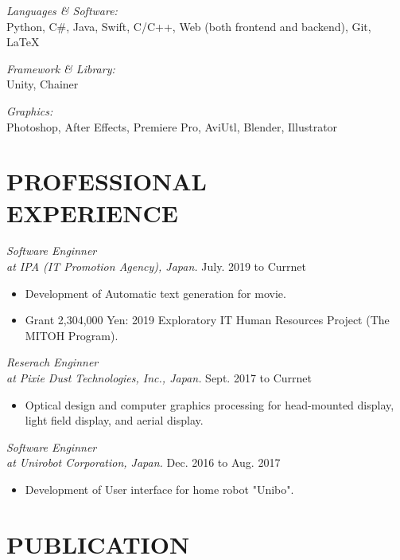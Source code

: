 \documentclass[margin]{res}
\begin{document}
\begin{resume}
{\sl Languages \& Software:}\\
Python,
C\#,
Java,
Swift,
C/C++,
Web (both frontend and backend),
Git, LaTeX

{\sl Framework \& Library:}\\
Unity, Chainer

{\sl Graphics:}\\
Photoshop, After Effects, Premiere Pro, AviUtl, Blender, Illustrator

\section{PROFESSIONAL \\ EXPERIENCE}

{\sl Software Enginner \\ at IPA (IT Promotion Agency), Japan.} \hfill July. 2019 to Currnet \\

\begin{itemize}
  \item Development of Automatic text generation for movie.
  \item Grant 2,304,000 Yen: 2019 Exploratory IT Human Resources Project (The MITOH Program).
\end{itemize}

{\sl Reserach Enginner \\ at Pixie Dust Technologies, Inc., Japan.} \hfill Sept. 2017 to Currnet \\

\begin{itemize}  \itemsep -2pt
  \item Optical design and computer graphics processing for head-mounted display, light field display, and aerial display.
\end{itemize}

{\sl Software Enginner \\ at Unirobot Corporation, Japan.} \hfill Dec. 2016 to Aug. 2017 \\

\begin{itemize}  \itemsep -2pt
  \item Development of User interface for home robot "Unibo".
\end{itemize}

\section{PUBLICATION}


\end{resume}
\end{document}
